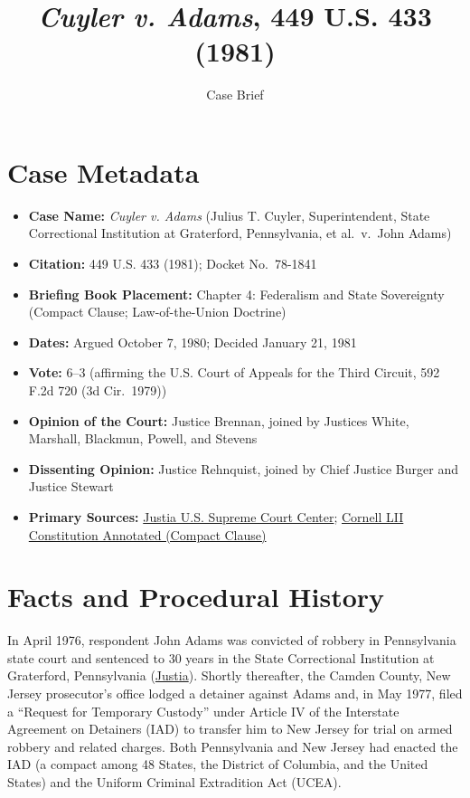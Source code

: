 \documentclass[12pt]{article}
\title{\textit{Cuyler v. Adams}, 449 U.S. 433 (1981)}
\author{Case Brief}
\date{}
\begin{document}
\maketitle

\section{Case Metadata}

\begin{itemize}
  \item \textbf{Case Name:} \textit{Cuyler v. Adams} (Julius T. Cuyler, Superintendent, State Correctional Institution at Graterford, Pennsylvania, et al.\ v.\ John Adams)
  \item \textbf{Citation:} 449 U.S. 433 (1981); Docket No.\ 78-1841
  \item \textbf{Briefing Book Placement:} Chapter 4: Federalism and State Sovereignty (Compact Clause; Law-of-the-Union Doctrine)
  \item \textbf{Dates:} Argued October 7, 1980; Decided January 21, 1981
  \item \textbf{Vote:} 6--3 (affirming the U.S. Court of Appeals for the Third Circuit, 592 F.2d 720 (3d Cir.\ 1979))
  \item \textbf{Opinion of the Court:} Justice Brennan, joined by Justices White, Marshall, Blackmun, Powell, and Stevens
  \item \textbf{Dissenting Opinion:} Justice Rehnquist, joined by Chief Justice Burger and Justice Stewart
  \item \textbf{Primary Sources:} \href{https://supreme.justia.com/cases/federal/us/449/433/}{Justia U.S. Supreme Court Center}; \href{https://www.law.cornell.edu/constitution-conan/article-1/section-1/clause-3/legal-effect-and-interpretation-of-compacts}{Cornell LII Constitution Annotated (Compact Clause)}
\end{itemize}

\section{Facts and Procedural History}

In April 1976, respondent John Adams was convicted of robbery in Pennsylvania state court and sentenced to 30 years in the State Correctional Institution at Graterford, Pennsylvania (\href{https://supreme.justia.com/cases/federal/us/449/433/}{Justia}). Shortly thereafter, the Camden County, New Jersey prosecutor's office lodged a detainer against Adams and, in May 1977, filed a ``Request for Temporary Custody'' under Article IV of the Interstate Agreement on Detainers (IAD) to transfer him to New Jersey for trial on armed robbery and related charges. Both Pennsylvania and New Jersey had enacted the IAD (a compact among 48 States, the District of Columbia, and the United States) and the Uniform Criminal Extradition Act (UCEA).
\end{document}
